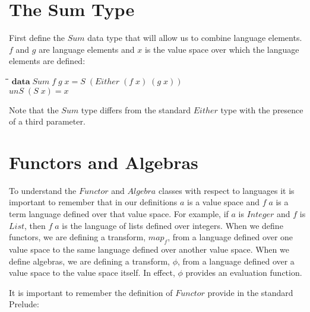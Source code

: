 \documentclass[11pt]{article}
\newlength{\lwidth}\setlength{\lwidth}{4.5cm}
\newlength{\cwidth}\setlength{\cwidth}{8mm} %
\newcommand{\Conid}[1]{\mathit{#1}}
\newcommand{\Varid}[1]{\mathit{#1}}
\begin{document}
\section{The Sum Type}

First define the \ensuremath{\Conid{Sum}} data type that will allow us to combine language
elements.  \ensuremath{\Varid{f}} and \ensuremath{\Varid{g}} are language elements and \ensuremath{\Varid{x}} is the value space
over which the language elements are defined:

\begin{tabbing}
\qquad\=\hspace{\lwidth}\=\hspace{\cwidth}\=\+\kill
${\mathbf{data}\;\Conid{Sum}\;\Varid{f}\;\Varid{g}\;\Varid{x}\mathrel{=}\Conid{S}\;(\Conid{Either}\;(\Varid{f}\;\Varid{x})\;(\Varid{g}\;\Varid{x}))}$\\
${\Varid{unS}\;(\Conid{S}\;\Varid{x})\mathrel{=}\Varid{x}}$
\end{tabbing}
Note that the \ensuremath{\Conid{Sum}} type differs from the standard \ensuremath{\Conid{Either}} type with
the presence of a third parameter.

\section{Functors and Algebras}

To understand the \ensuremath{\Conid{Functor}} and \ensuremath{\Conid{Algebra}} classes with respect to
languages it is important to remember that in our definitions \ensuremath{\Varid{a}} is a
value space and \ensuremath{\Varid{f}\;\Varid{a}} is a term language defined over that value
space.  For example, if \ensuremath{\Varid{a}} is \ensuremath{\Conid{Integer}} and \ensuremath{\Varid{f}} is \ensuremath{\Conid{List}}, then \ensuremath{\Varid{f}\;\Varid{a}}
is the language of lists defined over integers.  When we define
functors, we are defining a transform, \ensuremath{\Varid{map}_{f}}, from a language defined
over one value space to the same language defined over another value
space.  When we define algebras, we are defining a transform, \ensuremath{\Varid{\phi}},
from a language defined over a value space to the value space itself.
In effect, \ensuremath{\Varid{\phi}} provides an evaluation function.

It is important to remember the definition of \ensuremath{\Conid{Functor}} provide in the
standard Prelude:
\end{document}
